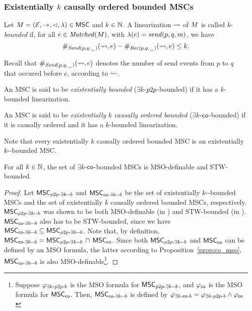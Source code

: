 \subsubsection{Existentially \texorpdfstring{$k$}{k} causally ordered bounded MSCs} 

\begin{definition}
Let $M = (\mathcal{E},\to,\lhd,\lambda) \in \mathsf{MSC}$ and $k \in \mathbb{N}$.
A linearization $\rightsquigarrow$ of $M$ is called
$k$-\emph{bounded} if, for all $e \in \mathit{Matched}(M)$, with $\lambda(e) = \mathit{send}(p, q, m)$, we have 
\[
\#_{{\mathit{Send}(p,q,\hspace{0.1em}\underline{\hspace{0.5em}}\hspace{0.1em})}}(\rightsquigarrow,e) - \#_{{\mathit{Rec}(p,q,\hspace{0.1em}\underline{\hspace{0.5em}}\hspace{0.1em})}}(\rightsquigarrow,e) \le k.
\]
\end{definition}
\noindent Recall that $\#_{{\mathit{Send}(p,q,\hspace{0.1em}\underline{\hspace{0.5em}}\hspace{0.1em})}}(\rightsquigarrow,e)$ denotes the number of send events from $p$ to $q$ that occured before $e$, according to $\rightsquigarrow$.

\begin{definition}\label{def:ex_k_pp_bounded}
	An MSC is said to be \emph{existentially \pp bounded} ($\exists k$-$p2p$-bounded) if it has a $k$-bounded linearization.
\end{definition}

\begin{definition}\label{def:ex_k_co_bounded}
An MSC is said to be \emph{existentially $k$ causally ordered bounded} ($\exists k$-$\mathsf{co}$-bounded) if it is causally ordered and it has a $k$-bounded linearization.
\end{definition}

Note that every existentially $k$ causally ordered bounded MSC is an existentially $k$-\pp-bounded MSC.

\begin{proposition}\label{prop:ek-co-bounded-mso-stw}
For all $k \in \mathbb{N}$, the set of $\exists k$-$\mathsf{co}$-bounded MSCs is MSO-definable and STW-bounded.
\end{proposition}
\begin{proof}
Let $\mathsf{MSC}_{p2p\text{-}\exists k\text{-}\text{-}b}$ and $\mathsf{MSC}_{\mathsf{co}\text{-}\exists k\text{-}\text{-}b}$ be the set of existentially $k$-\pp-bounded MSCs and the set of existentially $k$ causally ordered bounded MSCs, respectively. $\mathsf{MSC}_{p2p\text{-}\exists k\text{-}\text{-}b}$ was shown to be both MSO-definable (in \cite{DBLP:journals/iandc/LohreyM04}) and STW-bounded (in \cite[Proposition 5.4, page 163]{DBLP:journals/corr/abs-1904-06942}). $\mathsf{MSC}_{\mathsf{co}\text{-}\exists k\text{-}\text{-}b}$ also has to be STW-bounded, since we have $\mathsf{MSC}_{\mathsf{co}\text{-}\exists k\text{-}\text{-}b} \subseteq \mathsf{MSC}_{p2p\text{-}\exists k\text{-}\text{-}b}$. Note that, by definition, $\mathsf{MSC}_{\mathsf{co}\text{-}\exists k\text{-}\text{-}b} = \mathsf{MSC}_{p2p\text{-}\exists k\text{-}\text{-}b}\, \cap\, \mathsf{MSC}_{\mathsf{co}}$. Since both $\mathsf{MSC}_{p2p\text{-}\exists k\text{-}\text{-}b}$ and $\mathsf{MSC}_{\mathsf{co}}$ can be defined by an MSO formula, the latter according to Proposition~\ref{prop:co_mso}, $\mathsf{MSC}_{\mathsf{co}\text{-}\exists k\text{-}\text{-}b}$ is also MSO-definable\footnote{Suppose $\varphi_{\exists k\text{-}p2p\text{-}b}$ is the MSO formula for $\mathsf{MSC}_{p2p\text{-}\exists k\text{-}\text{-}b}$, and $\varphi_{\mathsf{co}}$ is the MSO formula for $\mathsf{MSC}_{\mathsf{co}}$. Then, $\mathsf{MSC}_{\mathsf{co}\text{-}\exists k\text{-}\text{-}b}$ is defined by $\varphi_{\exists k\text{-}\mathsf{co}\text{-}b} = \varphi_{\exists k\text{-}p2p\text{-}b} \wedge \varphi_{\mathsf{co}}$}.
\end{proof}

